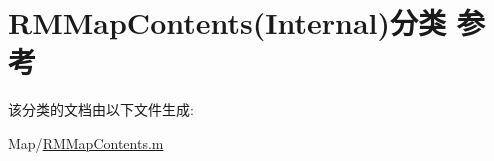 \hypertarget{category_r_m_map_contents_07_internal_08}{\section{R\-M\-Map\-Contents(Internal)分类 参考}
\label{category_r_m_map_contents_07_internal_08}
}


该分类的文档由以下文件生成\-:\begin{DoxyCompactItemize}
\item 
Map/\hyperlink{_r_m_map_contents_8m}{R\-M\-Map\-Contents.\-m}\end{DoxyCompactItemize}

